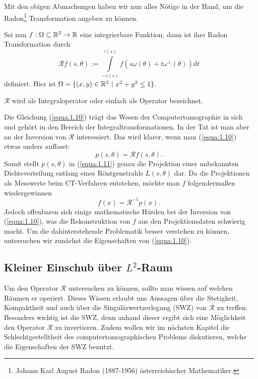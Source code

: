 Mit den obigen Abmachungen haben wir nun alles Nötige in der Hand, um die Radon\footnote{\label{foot:4} Johann Karl August Radon (1887-1956) österreichischer Mathematiker.} Transformation angeben zu können. 
\begin{Definition}
	Sei nun $f:\Omega \subseteq \mathbb{R}^2 \rightarrow \mathbb{R}$ eine integrierbare Funktion, dann ist ihre Radon Transformation durch
	\begin{equation}
		\mathcal{R}f(s,\theta) := \int\limits_{-\gamma(s)}^{\gamma(s)} f(s\omega(\theta) + t\omega^{\perp}(\theta)) \mbox{d}t
		\label{equa:1.10}
	\end{equation}
	definiert. Hier ist $\Omega = \{ (x,y) \in \mathbb{R}^2 \ | \ x^2 + y^2 \leq 1 \}$.
	\label{def.1}
\end{Definition}

\begin{Bemerkung}
	$\mathcal{R}$ wird als Integraloperator oder einfach als Operator bezeichnet.
	\label{bem:1} 
\end{Bemerkung}

Die Gleichung (\ref{equa:1.10}) trägt das Wesen der Computertomographie in sich und gehört in den Bereich der Integraltransformationen. In der Tat ist man aber an der Inversion von $\mathcal{R}$ interessiert. Das wird klarer, wenn man (\ref{equa:1.10}) etwas anders auffasst:
\begin{equation}
	p(s,\theta) = \mathcal{R}f(s,\theta).
	\label{equa:1.11}
\end{equation}
Somit stellt $p(s,\theta)$ in (\ref{equa:1.11}) genau die Projektion einer unbekannten Dichteverteilung entlang eines Röntgenstrahls $L(s,\theta)$ dar. Da die Projektionen als Messwerte beim CT-Verfahren entstehen, möchte man $f$ folgendermaßen wiedergewinnen 
\begin{equation}
	f(x) = \mathcal{R}^{-1}p(x).
	\label{equa:1.12}
\end{equation}
Jedoch offenbaren sich einige mathematische Hürden bei der Inversion von (\ref{equa:1.10}), was die Rekonstruktion von $f$ aus den Projektionsdaten schwierig macht. Um die dahinterstehende Problematik besser verstehen zu können, untersuchen wir zunächst die Eigenschaften von (\ref{equa:1.10}).

\subsection{Kleiner Einschub über $L^2$-Raum}
\label{cha:1.2.1}

Um den Operator $\mathcal{R}$ untersuchen zu können, sollte man wissen auf welchen Räumen er operiert. Dieses Wissen erlaubt uns Aussagen über die Stetigkeit, Kompaktheit und auch über die Singulärwertzerlegung (SWZ) von $\mathcal{R}$ zu treffen. Besonders wichtig ist die SWZ, denn anhand dieser ergibt sich eine Möglichkeit den Operator $\mathcal{R}$ zu invertieren. Zudem wollen wir im nächsten Kapitel die Schlechtgestelltheit des computertomographischen Problems diskutieren, welche die Eigenschaften der SWZ benutzt.

